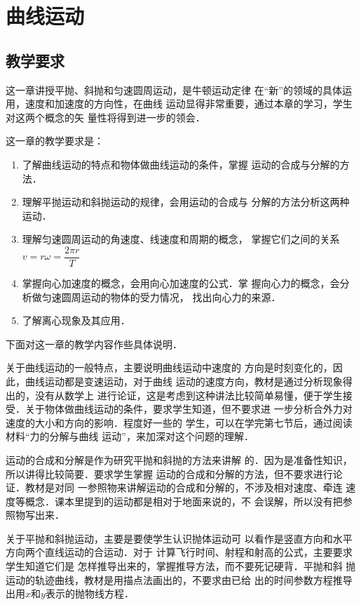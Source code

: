 
\chapter{曲线运动}\minitoc[n]
\section{教学要求}
这一章讲授平抛、斜抛和匀速圆周运动，是牛顿运动定律
在“新”的领域的具体运用，速度和加速度的方向性，在曲线
运动显得非常重要，通过本章的学习，学生对这两个概念的矢
量性将得到进一步的领会．

这一章的教学要求是：
\begin{enumerate}
\item 了解曲线运动的特点和物体做曲线运动的条件，掌握
运动的合成与分解的方法．
\item 理解平抛运动和斜抛运动的规律，会用运动的合成与
分解的方法分析这两种运动．
\item 理解匀速圆周运动的角速度、线速度和周期的概念，
掌握它们之间的关系$v=r\omega=\dfrac{2\pi r}{T}$
\item 掌握向心加速度的概念，会用向心加速度的公式．掌
握向心力的概念，会分析做匀速圆周运动的物体的受力情况，
找出向心力的来源．
\item 了解离心现象及其应用．
\end{enumerate}

下面对这一章的教学内容作些具体说明．

关于曲线运动的一般特点，主要说明曲线运动中速度的
方向是时刻变化的，因此，曲线运动都是变速运动，对于曲线
运动的速度方向，教材是通过分析现象得出的，没有从数学上
进行论证，这是考虑到这种讲法比较简单易懂，便于学生接
受．关于物体做曲线运动的条件，要求学生知道，但不要求进
一步分析合外力对速度的大小和方向的影响．程度好一些的
学生，可以在学完第七节后，通过阅读材料“力的分解与曲线
运动”，来加深对这个问题的理解．

运动的合成和分解是作为研究平抛和斜抛的方法来讲解
的．因为是准备性知识，所以讲得比较简要．要求学生掌握
运动的合成和分解的方法，但不要求进行论证．教材是对同
一参照物来讲解运动的合成和分解的，不涉及相对速度、牵连
速度等概念．课本里提到的运动都是相对于地面来说的，不
会误解，所以没有把参照物写出来．

关于平抛和斜抛运动，主要是要使学生认识抛体运动可
以看作是竖直方向和水平方向两个直线运动的合运动．对于
计算飞行时间、射程和射高的公式，主要要求学生知道它们是
怎样推导出来的，掌握推导方法，而不要死记硬背．平抛和斜
抛运动的轨迹曲线，教材是用描点法画出的，不要求由已给
出的时间参数方程推导出用$x$和$y$表示的抛物线方程．

